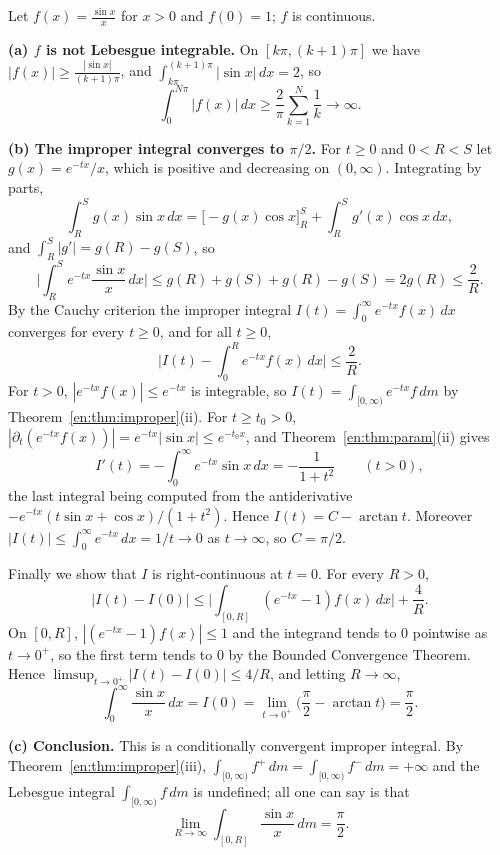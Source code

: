 \documentclass[11pt]{article}
\makeatletter
\newcommand{\envlabel}[1]{\protected@edef\@currentlabel{\themathenv}\label{#1}}
\makeatother
\begin{document}
\begin{example}\envlabel{en:ex:sinc}
Let $f(x)=\frac{\sin x}{x}$ for $x>0$ and $f(0)=1$; $f$ is continuous.

\textbf{(a) $f$ is not Lebesgue integrable.} On $[k\pi,(k+1)\pi]$ we have $|f(x)|\geq\frac{|\sin x|}{(k+1)\pi}$, and $\int_{k\pi}^{(k+1)\pi}|\sin x|\,dx=2$, so
\[
\int_{0}^{N\pi}|f(x)|\,dx\geq\frac{2}{\pi}\sum_{k=1}^{N}\frac1k\to\infty.
\]

\textbf{(b) The improper integral converges to $\pi/2$.} For $t\geq0$ and $0<R<S$ let $g(x)=e^{-tx}/x$, which is positive and decreasing on $(0,\infty)$. Integrating by parts,
\[
\int_{R}^{S}g(x)\sin x\,dx=\big[-g(x)\cos x\big]_{R}^{S}+\int_{R}^{S}g'(x)\cos x\,dx,
\]
and $\int_{R}^{S}|g'|=g(R)-g(S)$, so
\[
\Big|\int_{R}^{S}e^{-tx}\frac{\sin x}{x}\,dx\Big|\leq g(R)+g(S)+g(R)-g(S)=2g(R)\leq\frac{2}{R}.\tag{$\ast\ast$}
\]
By the Cauchy criterion the improper integral $I(t)=\int_{0}^{\infty}e^{-tx}f(x)\,dx$ converges for every $t\geq0$, and for all $t\geq0$,
\[
\Big|I(t)-\int_{0}^{R}e^{-tx}f(x)\,dx\Big|\leq\frac2R.
\]
For $t>0$, $|e^{-tx}f(x)|\leq e^{-tx}$ is integrable, so $I(t)=\int_{[0,\infty)}e^{-tx}f\,dm$ by Theorem~\ref{en:thm:improper}(ii). For $t\geq t_{0}>0$, $|\partial_{t}(e^{-tx}f(x))|=e^{-tx}|\sin x|\leq e^{-t_{0}x}$, and Theorem~\ref{en:thm:param}(ii) gives
\[
I'(t)=-\int_{0}^{\infty}e^{-tx}\sin x\,dx=-\frac{1}{1+t^{2}}\qquad(t>0),
\]
the last integral being computed from the antiderivative $-e^{-tx}(t\sin x+\cos x)/(1+t^{2})$. Hence $I(t)=C-\arctan t$. Moreover $|I(t)|\leq\int_{0}^{\infty}e^{-tx}\,dx=1/t\to0$ as $t\to\infty$, so $C=\pi/2$.

Finally we show that $I$ is right-continuous at $t=0$. For every $R>0$,
\[
|I(t)-I(0)|\leq\Big|\int_{[0,R]}(e^{-tx}-1)f(x)\,dx\Big|+\frac4R.
\]
On $[0,R]$, $|(e^{-tx}-1)f(x)|\leq1$ and the integrand tends to $0$ pointwise as $t\to0^{+}$, so the first term tends to $0$ by the Bounded Convergence Theorem. Hence $\limsup_{t\to0^{+}}|I(t)-I(0)|\leq4/R$, and letting $R\to\infty$,
\[
\int_{0}^{\infty}\frac{\sin x}{x}\,dx=I(0)=\lim_{t\to0^{+}}\Big(\frac\pi2-\arctan t\Big)=\frac{\pi}{2}.
\]

\textbf{(c) Conclusion.} This is a conditionally convergent improper integral. By Theorem~\ref{en:thm:improper}(iii), $\int_{[0,\infty)}f^{+}\,dm=\int_{[0,\infty)}f^{-}\,dm=+\infty$ and the Lebesgue integral $\int_{[0,\infty)}f\,dm$ is undefined; all one can say is that
\[
\lim_{R\to\infty}\int_{[0,R]}\frac{\sin x}{x}\,dm=\frac\pi2.
\]
\end{example}
\end{document}
